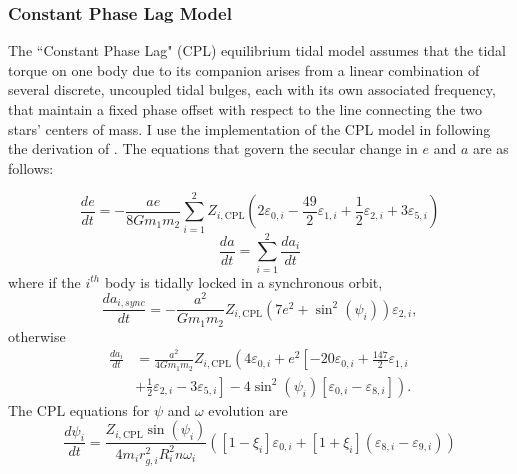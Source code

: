\subsubsection{Constant Phase Lag Model}

The ``Constant Phase Lag" (CPL) \citep[][]{FerrazMello2008,Heller2011} equilibrium tidal model assumes that the tidal torque on one body due to its companion arises from a linear combination of several discrete, uncoupled tidal bulges, each with its own associated frequency, that maintain a fixed phase offset with respect to the line connecting the two stars' centers of mass. I use the \eqtide implementation of the CPL model in \vplanet following the derivation of \citet{FerrazMello2008}.  The equations that govern the secular change in $e$ and $a$ are as follows:

\begin{equation} \label{sync:eqn:cpl:e}
\frac{de}{dt} = -\frac{ae}{8 G m_1 m_2} \sum_{i=1}^2 Z_{i,\mathrm{CPL}} \left( 2 \varepsilon_{0,i} - \frac{49}{2} \varepsilon_{1,i} + \frac{1}{2} \varepsilon_{2,i} + 3 \varepsilon_{5,i} \right)
\end{equation}
\begin{equation} \label{sync:eqn:cpl:a}
\frac{da}{dt} = \sum_{i=1}^2 \frac{da_i}{dt}
\end{equation}
where if the $i^{th}$ body is tidally locked in a synchronous orbit,
\begin{equation} \label{sync:eqn:cpl:dadt_locked}
\frac{da_{i,sync}}{dt} = -\frac{a^2}{G m_1 m_2} Z_{i,\mathrm{CPL}} \left( 7 e^2 + \sin^2 (\psi_i) \right) \varepsilon_{2,i},
\end{equation}
otherwise
\begin{equation}
\begin{split}
\frac{da_i}{dt} & = \frac{a^2}{4 G m_1 m_2} Z_{i,\mathrm{CPL}} \left( 4 \varepsilon_{0,i} + e^2 \left[ -20 \varepsilon_{0,i} + \frac{147}{2} \varepsilon_{1,i} \right. \right. \\
&  + \left. \left. \frac{1}{2} \varepsilon_{2,i} - 3 \varepsilon_{5,i} \right] - 4 \sin^2 (\psi_i) \left[ \varepsilon_{0,i} - \varepsilon_{8,i} \right] \right).
\end{split}
\end{equation}
The CPL equations for $\psi$ and $\omega$ evolution are
\begin{equation} \label{sync:eqn:cpl:psi}
\frac{d\psi_i}{dt} = \frac{Z_{i,\mathrm{CPL}} \sin(\psi_i)}{4 m_i r_{g,i}^2 R_i^2 n \omega_i} \left( [1-\xi_i] \varepsilon_{0,i} + [1+\xi_i](\varepsilon_{8,i} - \varepsilon_{9,i}) \right)
\end{equation}
